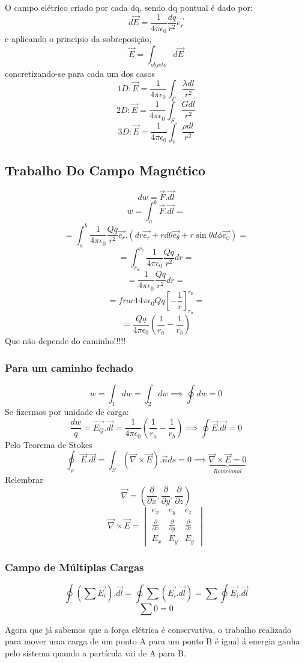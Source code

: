 \documentclass[a4paper]{article}
\begin{document}
O campo elétrico criado por cada dq, sendo dq pontual é dado por:
\[d\vec{E} = \frac{1}{4\pi\epsilon_0} \frac{dq}{r^2} \vec{e_r}\]
e aplicando o principio da sobreposição,
\[\vec{E}= \int_{objeto}{d\vec{E}}\]
concretizando-se para cada um dos casos
\[1D:        \vec{E} = \frac{1}{4\pi\epsilon_0} \int_{\Gamma}{\frac{\lambda dl}{r^2}} \]
\[2D:        \vec{E} = \frac{1}{4\pi\epsilon_0} \int_{S}{\frac{Gdl}{r^2}} \]
\[3D:        \vec{E} = \frac{1}{4\pi\epsilon_0} \int_{v}{\frac{\rho dl}{r^2}} \]

\subsection{Trabalho Do Campo Magnético}
\[dw = \vec{F}.\vec{dl}\]
\[w = \int_{a}^{b}\vec{F}.\vec{dl} =\]
\[=\int_{a}^{b}\frac{1}{4\pi\epsilon_0} \frac{Qq}{r^2}\vec{e_r}.(dr\vec{e_r}+ rd\theta\vec{e_\theta}+r\sin{\theta}d\phi\vec{e_\phi}) = \]
\[=\int_{r_a}^{r_b}\frac{1}{4\pi\epsilon_0}\frac{Qq}{r^2} dr =\]
\[=\frac{1}{4\pi\epsilon_0}\frac{Qq}{r^2} dr = \]
\[ = frac{1}{4\pi\epsilon_0}Qq {\left[-\frac{1}{r}\right]}_{r_a}^{r_b} =\]
\[=\frac{Qq}{4\pi\epsilon_0}\left(\frac{1}{r_a}-\frac{1}{r_b}\right)\]
Que não depende do caminho!!!!!

\subsubsection{Para um caminho fechado}
\[w = \int_{1}^{}dw = \int_{2}^{}dw \implies \oint{dw}=0 \]
Se fizermos por unidade de carga:
\[\frac{dw}{q} = \vec{E_Q}.\vec{dl}=\frac{1}{4\pi\epsilon_0}\left(\frac{1}{r_a}-\frac{1}{r_b}\right) \implies \oint{\vec{E}.\vec{dl}=0}\]
Pelo Teorema de Stokes
\[\oint_\rho{\vec{E}.\vec{dl}} = \int_{S}{\left(\vec{\nabla}\times\vec{E}\right).\vec{n}ds} = 0 \implies \underbrace{\vec{\nabla}\times\vec{E} = 0}_{Rotacional}\]
Relembrar
\[\vec{\nabla} = \left(\frac{\partial}{\partial x},\frac{\partial}{\partial y},\frac{\partial}{\partial z}\right)\]
\[\vec{\nabla}\times\vec{E}= 
\begin{vmatrix}
    e_x & e_y & e_z\\
    \frac{\partial}{\partial x} & \frac{\partial}{\partial y} & \frac{\partial}{\partial z}\\
    E_x & E_y & E_y
\end{vmatrix}\]
\subsubsection{Campo de Múltiplas Cargas}
\[\oint\left(\sum\vec{E_i}\right).\vec{dl} =\oint\sum\left(\vec{E_i}.\vec{dl}\right)= \sum\oint\vec{E_i}.\vec{dl}\]
\[\sum{0} = 0\]

Agora que já sabemos que a força elétrica é conservativa, o trabalho realizado para mover uma carga 
de um ponto A para um ponto B é igual á energia ganha pelo sistema quando a partícula vai de A para B.
\end{document}
